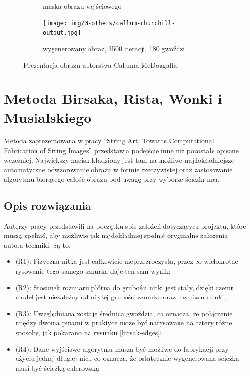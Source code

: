 \begin{figure}[htb]
\begin{subfigure}{0.32\textwidth}
            \caption{maska obrazu wejściowego}
            \label{others-callum-output-b}
        \end{subfigure}
        \begin{subfigure}{0.32\textwidth}
            \centering
            \texttt{[image: img/3-others/callum-churchill-output.jpg]}
            \caption{wygenerowany obraz, 3500 iteracji, 180 gwoździ}
            \label{others-callum-output-c}
        \end{subfigure}
        \caption{Prezentacja obrazu autorstwa Calluma McDougalla.}
        \label{others-callum-output}
        \end{figure}
        
    \section{Metoda Birsaka, Rista, Wonki i Musialskiego} \label{others-birsak}
    Metoda zaprezentowana w pracy ``String Art: Towards Computational Fabrication of String Images'' \cite{article-string-art-birsak} przedstawia podejście inne niż pozostałe opisane wcześniej. Największy nacisk kładziony jest tam na możliwe najdokładniejsze automatyczne odwzorowanie obrazu w formie rzeczywistej oraz zastosowanie algorytmu biorącego całość obrazu pod uwagę przy wyborze ścieżki nici. 
    
        \subsection{Opis rozwiązania}
        Autorzy pracy przedstawili na początku spis założeń dotyczących projektu, które muszą spełnić, aby możliwie jak najdokładniej spełnić oryginalne założenia autora techniki. Są to:
        \begin{itemize}
            \item (R1): Fizyczna nitka jest całkowicie nieprzezroczysta, przez co wielokrotne rysowanie tego samego sznurka daje ten sam wynik;
            \item (R2): Stosunek rozmiaru płótna do grubości nitki jest stały, dzięki czemu model jest niezależny od użytej grubości sznurka oraz rozmiaru ramki;
            \item (R3): Uwzględniana zostaje średnica gwoździa, co oznacza, że połączenie między dwoma pinami w praktyce może być narysowane na cztery różne sposoby, jak pokazano na rysunku \ref{birsak-edges};
            \item (R4): Dane wyjściowe algorytmu muszą być możliwe do fabrykacji przy użyciu jednej długiej nici, co oznacza, że ostatecznie wygenerowana ścieżka musi być ścieżką eulerowską
        \end{itemize}
        
